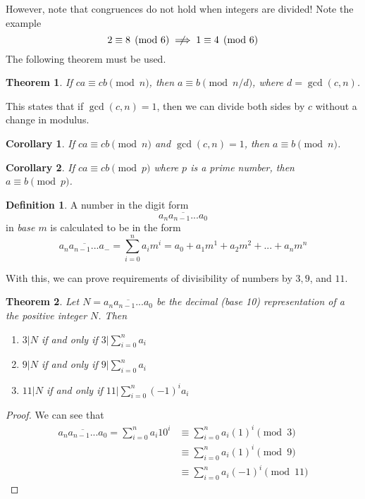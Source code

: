 \documentclass{article}
\newtheorem{theorem}{Theorem}[section]
\newtheorem{corollary}{Corollary}[theorem]
\theoremstyle{remark}
\theoremstyle{definition}
\newtheorem{definition}{Definition}[section]
\begin{document}
However, note that congruences do not hold when integers are divided! Note the example 
\[2 \equiv 8 \pmod{6} \centernot\implies 1 \equiv 4 \pmod{6}\]
The following theorem must be used. 

\begin{theorem}
If $ca \equiv cb \pmod{n}$, then $a \equiv b \pmod{n/d}$, where $d = \gcd(c, n)$. 
\end{theorem}

This states that if $\gcd(c, n) = 1$, then we can divide both sides by $c$ without a change in modulus. 

\begin{corollary}
If $ca \equiv cb \pmod{n}$ and $\gcd(c, n) = 1$, then $a \equiv b \pmod{n}$. 
\end{corollary}

\begin{corollary}
If $ca \equiv cb \pmod{p}$ where $p$ is a prime number, then $a \equiv b \pmod{p}$. 
\end{corollary}

\begin{definition}
A number in the digit form 
\[\overline{a_n a_{n-1} ...a_0}\]
in \textit{base $m$} is calculated to be in the form \[\overline{a_n a_{n-1} ...a_-} = \sum_{i=0}^n a_i m^i = a_0 + a_1 m^1 + a_2 m^2 + ... + a_n m^n\]
\end{definition}

With this, we can prove requirements of divisibility of numbers by $3, 9$, and $11$. 

\begin{theorem}
Let $N = \overline{a_n a_{n-1} ...a_0}$ be the decimal (base 10) representation of a the positive integer $N$. Then 
\begin{enumerate}
    \item $3|N$ if and only if $3 \big| \sum_{i=0}^n a_i$
    \item $9|N$ if and only if $9 \big| \sum_{i=0}^n a_i$
    \item $11|N$ if and only if $11 \big| \sum_{i=0}^n (-1)^{i} a_i$
\end{enumerate}
\end{theorem}
\begin{proof}
We can see that 
\begin{align*}
    \overline{a_n a_{n-1} ...a_0} = \sum_{i=0}^n a_i 10^i & \equiv \sum_{i=0}^n a_i (1)^i \pmod{3} \\
    & \equiv \sum_{i=0}^n a_i (1)^i \pmod{9} \\
    & \equiv \sum_{i=0}^n a_i (-1)^i \pmod{11}
\end{align*}
\end{proof}
\end{document}
